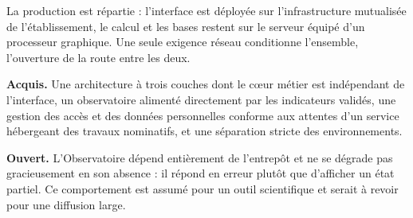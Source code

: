 La production est répartie : l'interface est déployée sur l'infrastructure mutualisée de
l'établissement, le calcul et les bases restent sur le serveur équipé d'un processeur
graphique. Une seule exigence réseau conditionne l'ensemble, l'ouverture de la route entre les
deux.

\begin{acquisouvert}
\textbf{Acquis.} Une architecture à trois couches dont le cœur métier est indépendant de
l'interface, un observatoire alimenté directement par les indicateurs validés, une gestion des
accès et des données personnelles conforme aux attentes d'un service hébergeant des travaux
nominatifs, et une séparation stricte des environnements.

\textbf{Ouvert.} L'Observatoire dépend entièrement de l'entrepôt et ne se dégrade pas
gracieusement en son absence : il répond en erreur plutôt que d'afficher un état partiel. Ce
comportement est assumé pour un outil scientifique et serait à revoir pour une diffusion large.
\end{acquisouvert}
